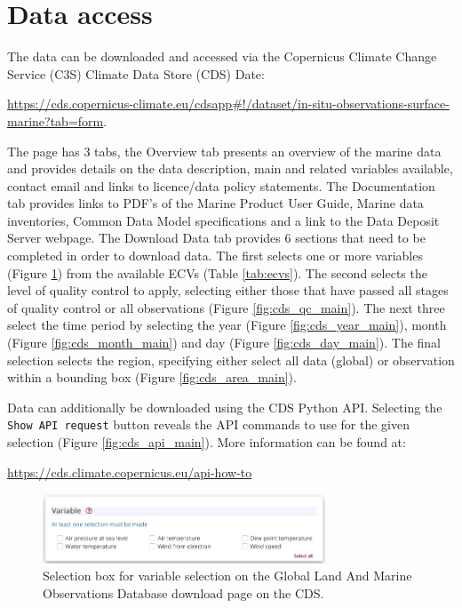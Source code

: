\section{Data access}
The data can be downloaded and accessed via the Copernicus Climate Change Service (C3S) Climate Data Store (CDS) Date:
\begin{center}
\sloppy\url{https://cds.copernicus-climate.eu/cdsapp\#!/dataset/in-situ-observations-surface-marine?tab=form}.
 \end{center}
The page has 3 tabs, the Overview tab presents an overview of the marine data and provides details on the data description, main and related variables available, contact email and links to licence/data policy statements. 
The Documentation tab provides links to PDF’s of the Marine Product User Guide, Marine data inventories, Common Data Model specifications and a link to the Data Deposit Server webpage. The Download Data tab provides 6 sections that need to be completed in order to download data. The first selects one or more variables (Figure \ref{fig:cds_variable_main}) from the available ECVs (Table \ref{tab:ecvs}). The second selects the level of quality control to apply, selecting either those that have passed all stages of quality control or all observations (Figure \ref{fig:cds_qc_main}). The next three select the time period  by selecting the year (Figure \ref{fig:cds_year_main}), month (Figure \ref{fig:cds_month_main}) and day (Figure \ref{fig:cds_day_main}). The final selection selects the region, specifying either select all data (global) or observation within a bounding box (Figure \ref{fig:cds_area_main}).

Data can additionally be downloaded using the CDS Python API. Selecting the \texttt{Show API request} button reveals the API commands to use for the given selection (Figure \ref{fig:cds_api_main}). More information can be found at:

\begin{center}
\url{https://cds.climate.copernicus.eu/api-how-to}
\end{center}

\begin{figure}[h]
\begin{center}
\includegraphics[width=0.75\textwidth]{resources/cds_variable_select.png}
\caption{Selection box for variable selection on the Global Land And Marine Observations Database download page on the CDS.}
\label{fig:cds_variable_main}
\end{center}
\end{figure}


